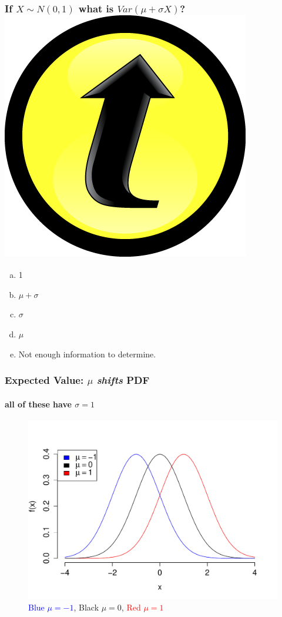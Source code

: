 \documentclass[handout]{beamer}
\begin{document}
\begin{frame}
  \frametitle{If $X\sim N(0,1)$ what is $Var(\mu + \sigma X)$?\hfill \includegraphics[scale = 0.05]{./images/clicker}}
  \begin{enumerate}[(a)]
    \item 1
    \item $\mu + \sigma$
    \item $\sigma$
    \item $\mu$
    \item Not enough information to determine. 
  \end{enumerate}
\end{frame}
\begin{frame}
  \frametitle{Expected Value: $\mu$ \emph{shifts} PDF}
\framesubtitle{all of these have $\sigma=1$}

\begin{figure}
\includegraphics[scale = 0.5]{./images/normal_means}
\caption{\textcolor{blue}{Blue $\mu = -1$},
Black $\mu = 0$,
\textcolor{red}{Red $\mu = 1$}}
\end{figure}
\end{frame}
\end{document}

